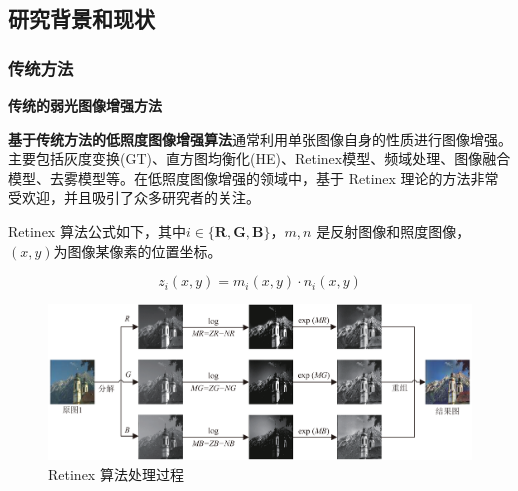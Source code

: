 \documentclass[CJK,aspectratio=169]{beamer}  %
\begin{document}
	\subsection{研究背景和现状}
	
	\subsubsection{传统方法}
	
	\begin{frame}
		{ \yahei \textbf{传统的弱光图像增强方法}}
		
		{ \yahei \textbf{基于传统方法的低照度图像增强算法}通常利用单张图像自身的性质进行图像增强。主要包括灰度变换(GT)\textcolor{blue}{\citep{ueng1995gamma}}、直方图均衡化(HE)\textcolor{blue}{\citep{stark2000adaptive}}、Retinex模型\textcolor{blue}{\citep{land1971lightness}}、频域处理\textcolor{blue}{\citep{liu2021benchmarking}}、图像融合模型\textcolor{blue}{\citep{dai2019fractional}}、去雾模型\textcolor{blue}{\citep{ma2019improved}}等。在低照度图像增强的领域中，基于 Retinex 理论的方法非常受欢迎，并且吸引了众多研究者的关注。}
		
		\vspace{0.2cm}
		
		{ \yahei  Retinex 算法公式如下，其中$i \in \{\mathbf{R, G, B}\}$，$m,n$ 是反射图像和照度图像，$(x,y)$为图像某像素的位置坐标。}
		
		{ \yahei $$z_i\left(x,y\right) = m_i\left(x,y\right) \cdot n_i\left(x,y\right)$$}
				
		\vspace{0.1cm}
		
		\begin{figure}
			\centering 
			\includegraphics[width=0.5\columnwidth]{picture/LLIE/Retinex Model/Retinex Model}
			\caption{
				\label{fig: Retinex model} 
				\tiny Retinex 算法处理过程
			}
		\end{figure}
	\end{frame}
	
\end{document}
